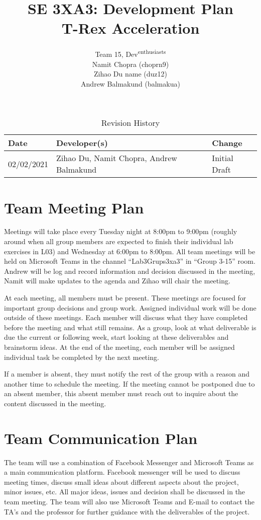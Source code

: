 \documentclass{article}
\title{SE 3XA3: Development Plan\\T-Rex Acceleration}
\author{Team 15, Dev\textsuperscript{enthusiasts}
		\\ Namit Chopra (choprn9)
		\\ Zihao Du name (duz12)
		\\ Andrew Balmakund (balmakua)
}
\date{}
\begin{document}
\begin{table}[hp]
\caption{Revision History} \label{TblRevisionHistory}
\begin{tabularx}{\textwidth}{llX}
\toprule
\textbf{Date} & \textbf{Developer(s)} & \textbf{Change}\\
\midrule
02/02/2021 & Zihao Du, Namit Chopra, Andrew Balmakund & Initial Draft\\
\bottomrule
\end{tabularx}
\end{table}

\newpage

\maketitle


\section{Team Meeting Plan}
Meetings will take place every Tuesday night at 8:00pm to 9:00pm (roughly around when all group members are expected to finish their individual lab exercises in L03) and Wednesday at 6:00pm to 8:00pm. All team meetings will be held on Microsoft Teams in the channel ``Lab3Grups3xa3'' in ``Group 3-15'' room. Andrew will be log and record information and decision discussed in the meeting, Namit will make updates to the agenda and Zihao will chair the meeting.

At each meeting, all members must be present. These meetings are focused for important group decisions and group work. Assigned individual work will be done outside of these meetings. Each member will discuss what they have completed before the meeting and what still remains. As a group, look at what deliverable is due the current or following week, start looking at these deliverables and brainstorm ideas. At the end of the meeting, each member will be assigned individual task be completed by the next meeting.

If a member is absent, they must notify the rest of the group with a reason and another time to schedule the meeting. If the meeting cannot be postponed due to an absent member, this absent member must reach out to inquire about the content discussed in the meeting.

\section{Team Communication Plan}
The team will use a combination of Facebook Messenger and Microsoft Teams as a main communication platform. Facebook messenger will be used to discuss meeting times, discuss small ideas about different aspects about the project, minor issues, etc. All major ideas, issues and decision shall be discussed in the team meeting. The team will also use Microsoft Teams and E-mail to contact the TA's and the professor for further guidance with the deliverables of the project.  
\end{document}
